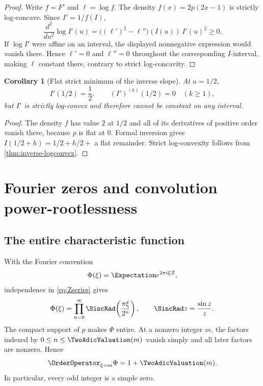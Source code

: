 \documentclass[11pt,oneside]{article}
\newtheorem{corollary}[theorem]{Corollary}
\theoremstyle{definition}
\theoremstyle{remark}
\begin{document}
\begin{proof}
Write $f=F'$ and $\ell=\log f$.  The density $f(x)=2p(2x-1)$ is strictly
log-concave.  Since $I'=1/f(I)$,
\[
 \frac{d^2}{du^2}\log I'(u)
 =\bigl((\ell')^2-\ell''\bigr)(I(u))\,I'(u)^2\ge0.
\]
If $\log I'$ were affine on an interval, the displayed nonnegative expression
would vanish there.  Hence $\ell'=0$ and $\ell''=0$ throughout the corresponding
$I$-interval, making $\ell$ constant there, contrary to strict log-concavity.
\end{proof}

\begin{corollary}[Flat strict minimum of the inverse slope]\label{cor:inverse-flat}
At $u=1/2$,
\begin{equation}
 I'(1/2)=\frac12,
 \qquad (I')^{(k)}(1/2)=0\quad(k\ge1),
\end{equation}
but $I'$ is strictly log-convex and therefore cannot be constant on any interval.
\end{corollary}

\begin{proof}
The density $f$ has value $2$ at $1/2$ and all of its derivatives of positive
order vanish there, because $p$ is flat at $0$.  Formal inversion gives
$I(1/2+h)=1/2+h/2+$ a flat remainder.  Strict log-convexity follows from
\cref{thm:inverse-logconvex}.
\end{proof}

\section{Fourier zeros and convolution power-rootlessness}

\subsection{The entire characteristic function}
With the Fourier convention
\[
 \Phi(\xi)=\Expectation e^{2\pi i\xi Z},
\]
independence in \eqref{eq:Zseries} gives
\begin{equation}\label{eq:sinc-product}
 \Phi(\xi)=\prod_{n=0}^{\infty}\SincRad\!\left(\frac{\pi\xi}{2^n}\right),
 \qquad \SincRad z=\frac{\sin z}{z}.
\end{equation}
The compact support of $p$ makes $\Phi$ entire.  At a nonzero integer $m$, the
factors indexed by $0\le n\le\TwoAdicValuation(m)$ vanish simply and all later factors are
nonzero.  Hence
\begin{equation}\label{eq:zero-order}
 \OrderOperator_{\xi=m}\Phi=1+\TwoAdicValuation(m).
\end{equation}
In particular, every odd integer is a simple zero.
\end{document}
